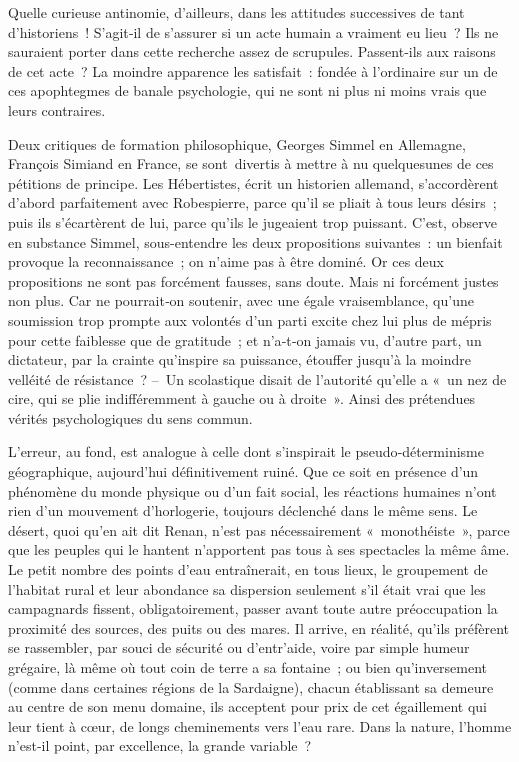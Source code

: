 \documentclass[french,twoside]{book} %
\begin{document}
\noindent Quelle curieuse antinomie, d’ailleurs, dans les attitudes successives de tant d’historiens ! S’agit‑il de s’assurer si un acte humain a vraiment eu lieu ? Ils ne sauraient porter dans cette recherche assez de scrupules. Passent‑ils aux raisons de cet acte ? La moindre apparence les satisfait : fondée à l’ordinaire sur un de ces apophtegmes de banale psychologie, qui ne sont ni plus ni moins vrais que leurs contraires.\par
Deux critiques de formation philosophique, Georges Simmel en Alle­magne, François Simiand en France, se sont divertis à mettre à nu quelques­unes de ces pétitions de principe. Les Hébertistes, écrit un historien allemand, s’accordèrent d’abord parfaitement avec Robespierre, parce qu’il se pliait à tous leurs désirs ; puis ils s’écartèrent de lui, parce qu’ils le jugeaient trop puissant. C’est, observe en substance Simmel, sous­-entendre les deux propositions suivantes : un bienfait provoque la recon­naissance ; on n’aime pas à être dominé. Or ces deux propositions ne sont pas forcément fausses, sans doute. Mais ni forcément justes non plus. Car ne pourrait‑on soutenir, avec une égale vraisemblance, qu’une soumission trop prompte aux volontés d’un parti excite chez lui plus de mépris pour cette faiblesse que de gratitude ; et n’a‑t‑on jamais vu, d’autre part, un dictateur, par la crainte qu’inspire sa puissance, étouffer jusqu’à la moindre velléité de résistance ? – Un scolastique disait de l’autorité qu’elle a « un nez de cire, qui se plie indifféremment à gauche ou à droite ». Ainsi des prétendues vérités psychologiques du sens commun.\par
L’erreur, au fond, est analogue à celle dont s’inspirait le pseudo‑déter­minisme géographique, aujourd’hui définitivement ruiné. Que ce soit en présence d’un phénomène du monde physique ou d’un fait social, les réactions humaines n’ont rien d’un mouvement d’horlogerie, toujours déclenché dans le même sens. Le désert, quoi qu’en ait dit Renan, n’est pas nécessairement « monothéiste », parce que les peuples qui le hantent n’apportent pas tous à ses spectacles la même âme. Le petit nombre des points d’eau entraînerait, en tous lieux, le groupement de l’habitat rural et leur abondance sa dispersion seulement s’il était vrai que les campagnards fissent, obligatoirement, passer avant toute autre préoc­cupation la proximité des sources, des puits ou des mares. Il arrive, en réalité, qu’ils préfèrent se rassembler, par souci de sécurité ou d’entr’aide, voire par simple humeur grégaire, là même où tout coin de terre a sa fontaine ; ou bien qu’inversement (comme dans certaines régions de la Sardaigne), chacun établissant sa demeure au centre de son menu domaine, ils acceptent pour prix de cet égaillement qui leur tient à cœur,  
\label{p103} de longs cheminements vers l’eau rare. Dans la nature, l’homme n’est‑il point, par excellence, la grande variable ?\par
\end{document}

